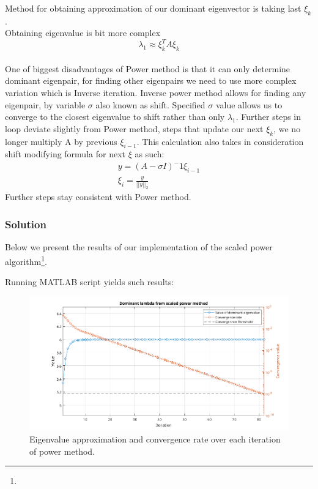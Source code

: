 Method for obtaining approximation of our dominant eigenvector is taking last $\xi_k$.\\
Obtaining eigenvalue is bit more complex
\begin{equation*}
    \lambda_1 \approx \xi_k^T A \xi_k 
\end{equation*}
\\
One of biggest disadvantages of Power method is that it can only determine dominant eigenpair, for finding other eigenpairs we need to use more complex variation which is Inverse iteration.
Inverse power method allows for finding any eigenpair, by variable $\sigma$ also known as shift\cite{Demmel}.
Specified $\sigma$ value allows us to converge to the closest eigenvalue to shift rather than only $\lambda_1$. Further steps in loop deviate slightly from Power method, steps that update our next $\xi_k$, we no longer multiply A by previous $\xi_{i-1}$. This calculation also takes in consideration shift modifying formula for next $\xi$ as such:
\begin{equation*}
    \begin{matrix}
        y = (A - \sigma I)^-1 \xi_{i-1}\\
        \xi_i = \frac{y}{||y||_2}
    \end{matrix}
\end{equation*}
Further steps stay consistent with Power method.
\subsubsection*{Solution}
Below we present the results of our \MATLAB{} implementation of the scaled power
algorithm\footnote{}.

Running MATLAB script yields such results:


\begin{figure}
    \centering
    \includegraphics[width=1\textwidth]{problems/Figures/Problem2ScaledPowerMethod.png}
    \caption{Eigenvalue approximation and convergence rate over each iteration of power method.}
    \label{fig:Power}
\end{figure}

